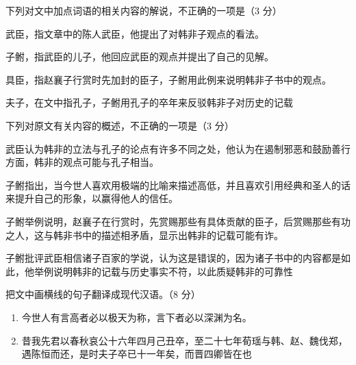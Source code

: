 \documentclass[zihao = -4]{exam-zh}
\begin{document}
       \begin{question}
         下列对文中加点词语的相关内容的解说，不正确的一项是（3 分）
         \begin{choices}
           \item 武臣，指文章中的陈人武臣，他提出了对韩非子观点的看法。 

           \item 子鲋，指武臣的儿子，他回应武臣的观点并提出了自己的见解。 

           \item 具臣，指赵襄子行赏时先加封的臣子，子鲋用此例来说明韩非子书中的观点。 

           \item 夫子，在文中指孔子，子鲋用孔子的卒年来反驳韩非子对历史的记载
  
         \end{choices}
       \end{question}

       \begin{question}
         下列对原文有关内容的概述，不正确的一项是（3 分）
         \begin{choices}
           \item 武臣认为韩非的立法与孔子的论点有许多不同之处，他认为在遏制邪恶和鼓励善行方面，韩非的观点可能与孔子相当。

           \item 子鲋指出，当今世人喜欢用极端的比喻来描述高低，并且喜欢引用经典和圣人的话来提升自己的形象，以赢得他人的信任。

           \item 子鲋举例说明，赵襄子在行赏时，先赏赐那些有具体贡献的臣子，后赏赐那些有功之人，这与韩非书中的描述相矛盾，显示出韩非的记载可能有诈。

           \item  子鲋批评武臣相信诸子百家的学说，认为这是错误的，因为诸子书中的内容都是如此，他举例说明韩非的记载与历史事实不符，以此质疑韩非的可靠性

         \end{choices}
       \end{question}

       \begin{question}
         把文中画横线的句子翻译成现代汉语。（8 分）
         \begin{enumerate}
           \item 今世人有言高者必以极天为称，言下者必以深渊为名。

           \item 昔我先君以春秋哀公十六年四月己丑卒，至二十七年荀瑶与韩、赵、魏伐郑，遇陈恒而还，是时夫子卒已十一年矣，而晋四卿皆在也

         \end{enumerate}
       \end{question}
\end{document}
